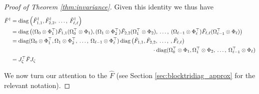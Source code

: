 \documentclass[12pt]{article}
\newcommand{\diag}{\operatorname{diag}}
\begin{document}
\begin{proof}[Proof of Theorem \ref{thm:invariance}]
Given this identity we thus have
\begin{align*}
\breve{F}^\dagger &= \diag\left( \tilde{F}^\dagger_{1,1}, \tilde{F}^\dagger_{2,2}, \: \ldots, \: \tilde{F}^\dagger_{\ell,\ell} \right) \\
&= \diag\left( (\Omega_0 \otimes \Phi_1^\top) \tilde{F}_{1,1} (\Omega_0^\top \otimes \Phi_1), (\Omega_1 \otimes \Phi_2^\top) \tilde{F}_{2,2} (\Omega_1^\top \otimes \Phi_2), \: \ldots, \: (\Omega_{\ell-1} \otimes \Phi_\ell^\top) \tilde{F}_{\ell,\ell} (\Omega_{\ell-1}^\top \otimes \Phi_\ell) \right) \\
&= \diag( \Omega_0 \otimes \Phi_1^\top, \Omega_1 \otimes \Phi_2^\top, \: \ldots, \: \Omega_{\ell-1} \otimes \Phi_\ell^\top ) \diag\left( \tilde{F}_{1,1}, \tilde{F}_{2,2}, \: \ldots, \:, \tilde{F}_{\ell,\ell} \right) \\
&\hspace{3.5in} \cdot \diag( \Omega_0^\top \otimes \Phi_1, \Omega_1^\top \otimes \Phi_2, \: \ldots, \: \Omega_{\ell-1}^\top \otimes \Phi_\ell ) \\
&= J_\zeta^\top \breve{F} J_\zeta
\end{align*}

We now turn our attention to the $\hat{F}$ (see Section \ref{sec:blocktridiag_approx} for the relevant notation). 


\end{proof}
\end{document}
